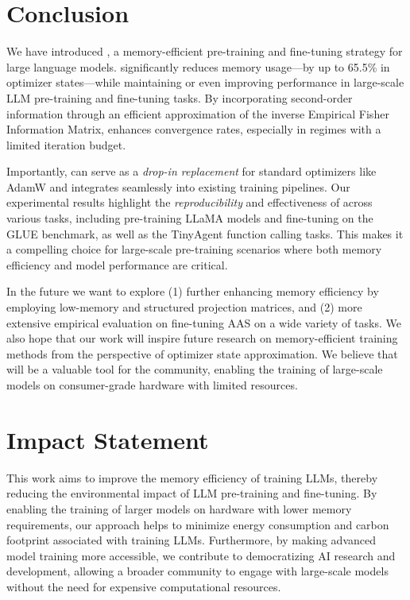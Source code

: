 \section{Conclusion}

We have introduced \textit{\lowrank}, a memory-efficient pre-training and fine-tuning strategy for large language models. \textit{\lowrank} significantly reduces memory usage—by up to 65.5\% in optimizer states—while maintaining or even improving performance in large-scale LLM pre-training and fine-tuning tasks. By incorporating second-order information through an efficient approximation of the inverse Empirical Fisher Information Matrix, \textit{\lowrank} enhances convergence rates, especially in regimes with a limited iteration budget.

Importantly, \textit{\lowrank} can serve as a \emph{drop-in replacement} for standard optimizers like AdamW and integrates seamlessly into existing training pipelines. Our experimental results highlight the \textit{reproducibility} and effectiveness of \textit{\lowrank} across various tasks, including pre-training LLaMA models and fine-tuning on the GLUE benchmark, as well as the TinyAgent function calling tasks. This makes it a compelling choice for large-scale pre-training scenarios where both memory efficiency and model performance are critical.

In the future we want to explore (1) further enhancing memory efficiency by employing low-memory and structured projection matrices, and (2) more extensive empirical evaluation on fine-tuning AAS on a wide variety of tasks. We also hope that our work will inspire future research on memory-efficient training methods from the perspective of optimizer state approximation. We believe that \textit{\lowrank} will be a valuable tool for the community, enabling the training of large-scale models on consumer-grade hardware with limited resources.

\section*{Impact Statement}

This work aims to improve the memory efficiency of training LLMs, thereby reducing the environmental impact of LLM pre-training and fine-tuning. By enabling the training of larger models on hardware with lower memory requirements, our approach helps to minimize energy consumption and carbon footprint associated with training LLMs. Furthermore, by making advanced model training more accessible, we contribute to democratizing AI research and development, allowing a broader community to engage with large-scale models without the need for expensive computational resources.